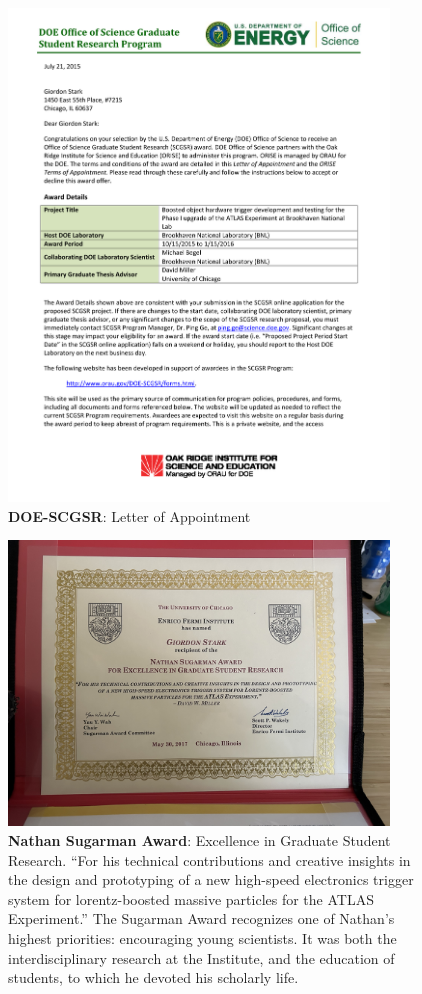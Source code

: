 \begin{figure}[h!]
	\centering
	\caption{\textbf{DOE-SCGSR}: Letter of Appointment}
	\includegraphics[width=0.9\textwidth]{attachments/D-research/DOE-SCGSR-Letter_of_Appointment}
\end{figure}

\begin{figure}[h!]
	\centering
	\caption{\textbf{Nathan Sugarman Award}: Excellence in Graduate Student Research. \enquote{For his technical contributions and creative insights in the design and prototyping of a new high-speed electronics trigger system for lorentz-boosted massive particles for the ATLAS Experiment.} The Sugarman Award recognizes one of Nathan's highest priorities: encouraging young scientists. It was both the interdisciplinary research at the Institute, and the education of students, to which he devoted his scholarly life.}
	\includegraphics[width=0.9\textwidth]{attachments/D-research/nathanSugarman}
\end{figure}

